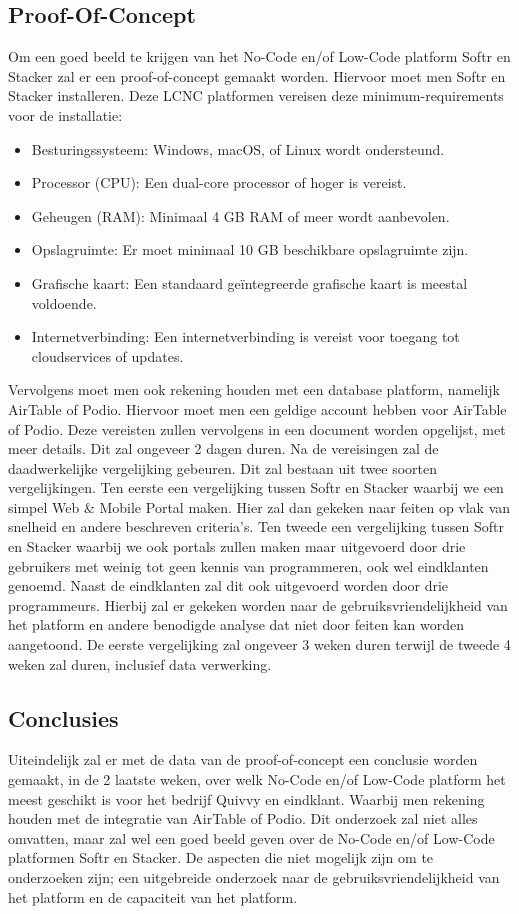 \subsection*{Proof-Of-Concept}
\label{sub:proof-of-concept}
Om een goed beeld te krijgen van het No-Code en/of Low-Code platform Softr en Stacker zal er een proof-of-concept gemaakt worden.
Hiervoor moet men Softr en Stacker installeren. 
Deze LCNC platformen vereisen deze minimum-requirements voor de installatie:
\begin{itemize}
  \item Besturingssysteem: Windows, macOS, of Linux wordt ondersteund.
  \item Processor (CPU): Een dual-core processor of hoger is vereist.
  \item Geheugen (RAM): Minimaal 4 GB RAM of meer wordt aanbevolen.
  \item Opslagruimte: Er moet minimaal 10 GB beschikbare opslagruimte zijn.
  \item Grafische kaart: Een standaard geïntegreerde grafische kaart is meestal voldoende.
  \item Internetverbinding: Een internetverbinding is vereist voor toegang tot cloudservices of updates. 
\end{itemize}
Vervolgens moet men ook rekening houden met een database platform, namelijk AirTable of Podio.
Hiervoor moet men een geldige account hebben voor AirTable of Podio. Deze vereisten zullen vervolgens in een 
document worden opgelijst, met meer details. Dit zal ongeveer 2 dagen duren.
Na de vereisingen zal de daadwerkelijke vergelijking gebeuren. Dit zal bestaan uit twee soorten vergelijkingen. Ten eerste
een vergelijking tussen Softr en Stacker waarbij we een simpel Web \& Mobile Portal maken. Hier zal dan gekeken naar feiten op vlak van snelheid en andere beschreven criteria's.
Ten tweede een vergelijking tussen Softr en Stacker waarbij we ook portals zullen maken maar uitgevoerd door drie gebruikers met weinig tot geen kennis van programmeren, ook wel eindklanten genoemd.
Naast de eindklanten zal dit ook uitgevoerd worden door drie programmeurs. Hierbij zal er gekeken worden naar de gebruiksvriendelijkheid van het platform en andere benodigde analyse dat niet door feiten kan worden aangetoond.
De eerste vergelijking zal ongeveer 3 weken duren terwijl de tweede 4 weken zal duren, inclusief data verwerking.

\subsection*{Conclusies}
\label{sub:conclusies}
Uiteindelijk zal er met de data van de proof-of-concept een conclusie worden gemaakt, in de 2 laatste weken, over welk No-Code en/of Low-Code platform het meest geschikt is voor het bedrijf Quivvy en eindklant. 
Waarbij men rekening houden met de integratie van AirTable of Podio. Dit onderzoek zal niet alles omvatten, maar zal wel een goed beeld geven over de No-Code en/of Low-Code platformen Softr en Stacker.
De aspecten die niet mogelijk zijn om te onderzoeken zijn; een uitgebreide onderzoek naar de gebruiksvriendelijkheid van het platform en de capaciteit van het platform.


